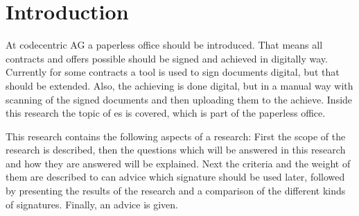 \section{Introduction}

At codecentric AG a paperless office should be introduced. That means all contracts and offers possible should be signed and achieved in digitally way. Currently for some contracts a tool is used to sign documents digital, but that should be extended. Also, the achieving is done digital, but in a manual way with scanning of the signed documents and then uploading them to the achieve. Inside this research the topic of \gls{es} is covered, which is part of the paperless office.

This research contains the following aspects of a research: First the scope of the research is described, then the questions which will be answered in this research and how they are answered will be explained. Next the criteria and the weight of them are described to can advice which signature should be used later, followed by presenting the results of the research and a comparison of the different kinds of signatures. Finally, an advice is given.  